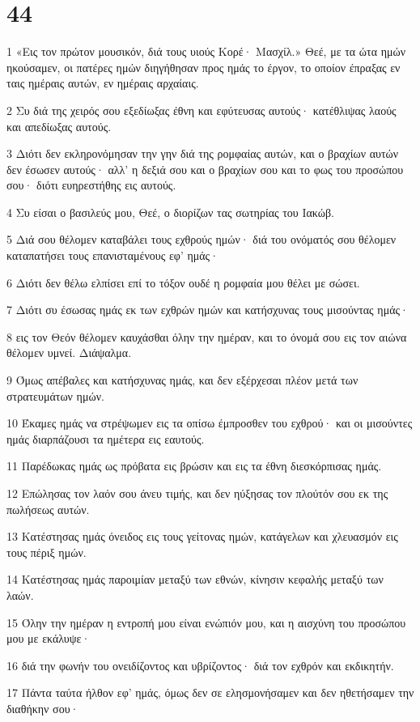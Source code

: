 \chapter{44}

\par 1 «Εις τον πρώτον μουσικόν, διά τους υιούς Κορέ· Μασχίλ.» Θεέ, με τα ώτα ημών ηκούσαμεν, οι πατέρες ημών διηγήθησαν προς ημάς το έργον, το οποίον έπραξας εν ταις ημέραις αυτών, εν ημέραις αρχαίαις.
\par 2 Συ διά της χειρός σου εξεδίωξας έθνη και εφύτευσας αυτούς· κατέθλιψας λαούς και απεδίωξας αυτούς.
\par 3 Διότι δεν εκληρονόμησαν την γην διά της ρομφαίας αυτών, και ο βραχίων αυτών δεν έσωσεν αυτούς· αλλ' η δεξιά σου και ο βραχίων σου και το φως του προσώπου σου· διότι ευηρεστήθης εις αυτούς.
\par 4 Συ είσαι ο βασιλεύς μου, Θεέ, ο διορίζων τας σωτηρίας του Ιακώβ.
\par 5 Διά σου θέλομεν καταβάλει τους εχθρούς ημών· διά του ονόματός σου θέλομεν καταπατήσει τους επανισταμένους εφ' ημάς·
\par 6 Διότι δεν θέλω ελπίσει επί το τόξον ουδέ η ρομφαία μου θέλει με σώσει.
\par 7 Διότι συ έσωσας ημάς εκ των εχθρών ημών και κατήσχυνας τους μισούντας ημάς·
\par 8 εις τον Θεόν θέλομεν καυχάσθαι όλην την ημέραν, και το όνομά σου εις τον αιώνα θέλομεν υμνεί. Διάψαλμα.
\par 9 Όμως απέβαλες και κατήσχυνας ημάς, και δεν εξέρχεσαι πλέον μετά των στρατευμάτων ημών.
\par 10 Έκαμες ημάς να στρέψωμεν εις τα οπίσω έμπροσθεν του εχθρού· και οι μισούντες ημάς διαρπάζουσι τα ημέτερα εις εαυτούς.
\par 11 Παρέδωκας ημάς ως πρόβατα εις βρώσιν και εις τα έθνη διεσκόρπισας ημάς.
\par 12 Επώλησας τον λαόν σου άνευ τιμής, και δεν ηύξησας τον πλούτόν σου εκ της πωλήσεως αυτών.
\par 13 Κατέστησας ημάς όνειδος εις τους γείτονας ημών, κατάγελων και χλευασμόν εις τους πέριξ ημών.
\par 14 Κατέστησας ημάς παροιμίαν μεταξύ των εθνών, κίνησιν κεφαλής μεταξύ των λαών.
\par 15 Όλην την ημέραν η εντροπή μου είναι ενώπιόν μου, και η αισχύνη του προσώπου μου με εκάλυψε·
\par 16 διά την φωνήν του ονειδίζοντος και υβρίζοντος· διά τον εχθρόν και εκδικητήν.
\par 17 Πάντα ταύτα ήλθον εφ' ημάς, όμως δεν σε ελησμονήσαμεν και δεν ηθετήσαμεν την διαθήκην σου·
